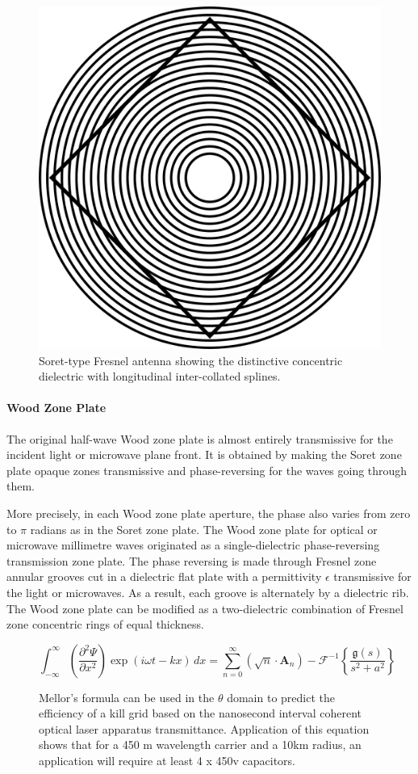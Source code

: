 \documentclass[review]{elsarticle}
\begin{document}
\begin{figure}
    \centering
    \includegraphics[width=0.5\linewidth]{Ehrenstein.png}
    \caption{Soret-type Fresnel antenna showing the distinctive concentric dielectric with longitudinal inter-collated splines.}
    \label{fig:enter-label}
\end{figure}

\paragraph{Wood Zone Plate} The original half-wave Wood zone plate is almost entirely transmissive for the incident light or microwave plane front. It is obtained by making the Soret zone plate opaque zones transmissive and phase-reversing for the waves going through them\cite{Feynman1963118,Dirac1953888}. 

More precisely, in each Wood zone plate aperture, the phase also varies  from zero to $\pi$ radians as in the Soret zone plate. The Wood zone plate for optical or microwave millimetre waves originated as a single-dielectric phase-reversing transmission zone plate. The phase reversing is made  through  Fresnel zone annular grooves cut in a dielectric flat plate with a permittivity $\epsilon$ transmissive for the light or microwaves. As a result, each groove is alternately by a dielectric rib. The Wood zone plate can be modified as a two-dielectric combination of Fresnel zone concentric rings of equal thickness.

\begin{figure}
\[
\int_{-\infty}^{\infty} \left( \frac{\partial^2 \Psi}{\partial x^2} \right) \exp\left(i\omega t - kx\right) \, dx = \sum_{n=0}^{\infty} \left( \sqrt{n} \cdot \mathbf{A}_n \right) - \mathcal{F}^{-1} \left\{ \frac{\mathfrak{g}(s)}{s^2 + a^2} \right\}
\]
\caption{Mellor's formula can be used in the $\theta$ domain to predict the efficiency of a kill grid based on the nanosecond interval coherent optical laser apparatus transmittance. Application of this equation shows that for a 450 \textmu m wavelength carrier and a 10km radius, an application will require at least 4 x 450v capacitors.}
\label{fig:Mellor's formula}
\end{figure}
\end{document}
